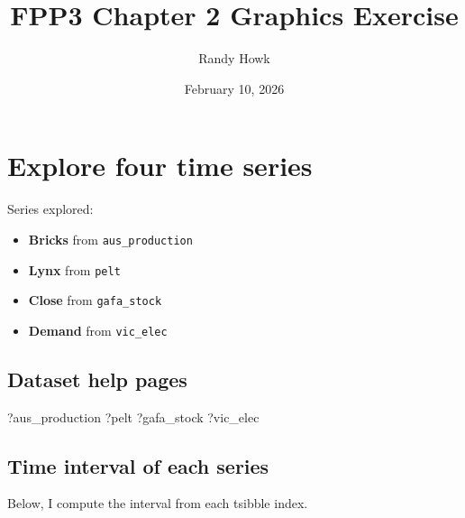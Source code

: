 \documentclass[
  11pt,
]{article}
\title{FPP3 Chapter 2 Graphics Exercise}
\author{Randy Howk}
\date{February 10, 2026}
\newenvironment{Shaded}{\begin{snugshade}}{\end{snugshade}}
\newcommand{\NormalTok}[1]{#1}
\providecommand{\tightlist}{%
  \setlength{\itemsep}{0pt}\setlength{\parskip}{0pt}}
\begin{document}
\maketitle

{
\setcounter{tocdepth}{2}
\tableofcontents
}
\section{Explore four time series}\label{explore-four-time-series}

Series explored:

\begin{itemize}
\tightlist
\item
  \textbf{Bricks} from \texttt{aus\_production}
\item
  \textbf{Lynx} from \texttt{pelt}
\item
  \textbf{Close} from \texttt{gafa\_stock}
\item
  \textbf{Demand} from \texttt{vic\_elec}
\end{itemize}

\subsection{Dataset help pages}\label{dataset-help-pages}

\begin{Shaded}
\begin{Highlighting}[]
\NormalTok{?aus\_production}
\NormalTok{?pelt}
\NormalTok{?gafa\_stock}
\NormalTok{?vic\_elec}
\end{Highlighting}
\end{Shaded}

\subsection{Time interval of each
series}\label{time-interval-of-each-series}

Below, I compute the interval from each tsibble index.
\end{document}
